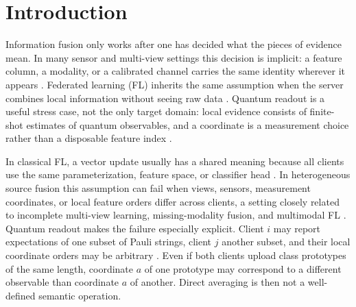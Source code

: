 \section{Introduction}

Information fusion only works after one has decided what the pieces of evidence mean. In many sensor and multi-view settings this decision is implicit: a feature column, a modality, or a calibrated channel carries the same identity wherever it appears \cite{castanedo2013datafusion,lahat2015multimodal,baltrusaitis2019multimodal,zhao2017multiview}. Federated learning (FL) inherits the same assumption when the server combines local information without seeing raw data \cite{mcmahan2017fedavg,yang2019federated,kairouz2021advances}. Quantum readout is a useful stress case, not the only target domain: local evidence consists of finite-shot estimates of quantum observables, and a coordinate is a measurement choice rather than a disposable feature index \cite{huang2020classicalshadows,hadfield2022locallybiased,bu2024pauli}.

In classical FL, a vector update usually has a shared meaning because all clients use the same parameterization, feature space, or classifier head \cite{mcmahan2017fedavg,kairouz2021advances}. In heterogeneous source fusion this assumption can fail when views, sensors, measurement coordinates, or local feature orders differ across clients, a setting closely related to incomplete multi-view learning, missing-modality fusion, and multimodal FL \cite{havaei2016hemis,tang2024incomplete,cai2024projected,lin2023federatedmultimodal}. Quantum readout makes the failure especially explicit. Client \(i\) may report expectations of one subset of Pauli strings, client \(j\) another subset, and their local coordinate orders may be arbitrary \cite{havlicek2019supervised,schuld2019feature,huang2020classicalshadows}. Even if both clients upload class prototypes of the same length, coordinate \(a\) of one prototype may correspond to a different observable than coordinate \(a\) of another. Direct averaging is then not a well-defined semantic operation.

